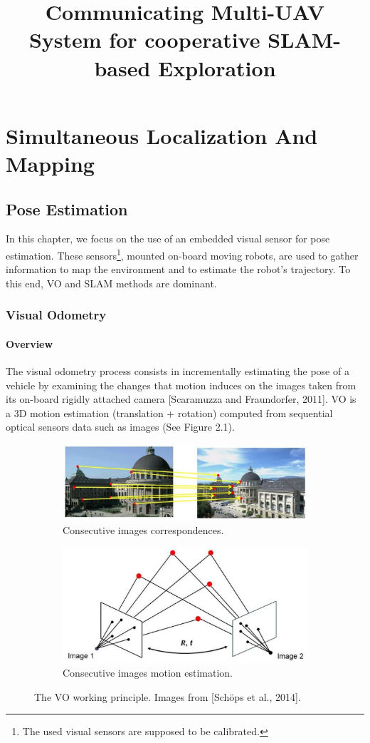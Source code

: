 \documentclass[11pt,openany]{book}
\title{Communicating Multi-UAV System for cooperative SLAM-based Exploration}
\begin{document}
\chapter{Simultaneous Localization And Mapping}
\section{Pose Estimation}
In this chapter, we focus on the use of an embedded visual sensor for pose estimation. These sensors\footnote{The used visual sensors are supposed to be calibrated.}, mounted on-board moving robots, are used to gather information to map the environment and to estimate the robot’s trajectory. To this end, VO and SLAM methods are dominant.
\subsection{Visual Odometry}
\subsubsection{Overview}
The visual odometry process consists in incrementally estimating the pose of a vehicle by examining the changes that motion induces on the images taken from its on-board rigidly attached camera [Scaramuzza and Fraundorfer, 2011]. VO is a 3D motion estimation (translation + rotation) computed from sequential optical sensors data such as images (See Figure 2.1).
\begin{figure}
    \centering
    \begin{subfigure}[h]{0.9\linewidth}
        \centering
        \includegraphics[width=\linewidth]{assets/2_1_a.png}
        \caption{{Consecutive images correspondences.}}
        \label{fig:subfigure1}
    \end{subfigure}
    \hfill
    \begin{subfigure}[h]{0.8\linewidth}
        \centering
        \includegraphics[width=\linewidth]{assets/2_1_b.png}
        \caption{{Consecutive images motion estimation.}}
        \label{fig:subfigure2}
    \end{subfigure}
    \caption{The VO working principle. Images from [Schöps et al., 2014].}
\end{figure}
\end{document}
